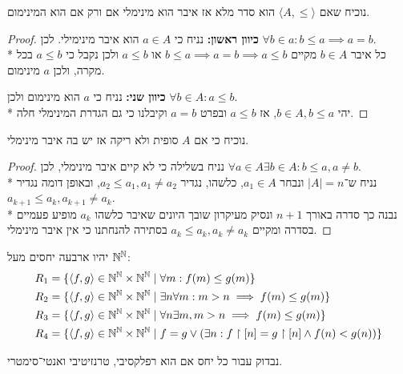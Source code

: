 \Subquestion{}
נוכיח שאם $\langle A, \le \rangle$ הוא סדר מלא אז איבר הוא מינימלי אם ורק אם הוא המינימום.
\begin{proof}
	\textbf{כיוון ראשון:}
	נניח כי $a \in A$ הוא איבר מינימילי. לכן $\forall b \in a : b \le a \implies a = b$. \\*
	כל איבר $b \in A$ מקיים $b \le a \implies a = b \implies a \le b$ או $a \le b$ ולכן נקבל כי $a \le b$ בכל מקרה, ולכן $a$ מינימום.

	\textbf{כיוון שני:}
	נניח כי $a$ הוא מינימום ולכן $\forall b \in A : a \le b$. \\*
	יהי $b \in A, b \le a$, אז $a \le b$ ובפרט $a = b$ וקיבלנו כי גם הגדרת המינימלי חלה.
\end{proof}

\Subquestion{}
נוכיח כי אם $A$ סופית ולא ריקה אז יש בה איבר מינימלי.
\begin{proof}
	נניח בשלילה כי לא קיים איבר מינימלי, לכן $\forall a \in A \exists b \in A : b \le a, a \ne b$. \\*
	נניח ש־$|A| = n$ ונבחר $a_1 \in A$, כלשהו, נגדיר $a_2 \le a_1, a_1 \ne a_2$, ובאופן דומה נגדיר $a_{k + 1} \le a_k, a_{k + 1} \ne a_k$. \\*
	נבנה כך סדרה באורך $n + 1$ ונסיק מעיקרון שובך היונים שאיבר כלשהו $a_k$ מופיע פעמיים בסדרה ומקיים $a_k \le a_k, a_k \ne a_k$ בסתירה להנחתנו כי אין איבר מינימלי.
\end{proof}

\Question{}
יהיו ארבעה יחסים מעל $\mathbb{N}^{\mathbb{N}}$:
\begin{align*}
	& R_1 = \{ \langle f, g \rangle \in \mathbb{N}^{\mathbb{N}} \times \mathbb{N}^{\mathbb{N}} \mid \forall m : f(m) \le g(m) \} \\
	& R_2 = \{ \langle f, g \rangle \in \mathbb{N}^{\mathbb{N}} \times \mathbb{N}^{\mathbb{N}} \mid \exists n \forall m : m > n \implies f(m) \le g(m) \} \\
	& R_3 = \{ \langle f, g \rangle \in \mathbb{N}^{\mathbb{N}} \times \mathbb{N}^{\mathbb{N}} \mid \forall n \exists m, m > n \implies f(m) \le g(m) \} \\
	& R_4 = \{ \langle f, g \rangle \in \mathbb{N}^{\mathbb{N}} \times \mathbb{N}^{\mathbb{N}} \mid f = g \lor (\exists n : f \restriction [n] = g \restriction [n] \land f(n) < g(n)) \}
\end{align*}

\Subquestion{}
נבדוק עבור כל יחס אם הוא רפלקסיבי, טרנזיטיבי ואנטי־סימטרי.

